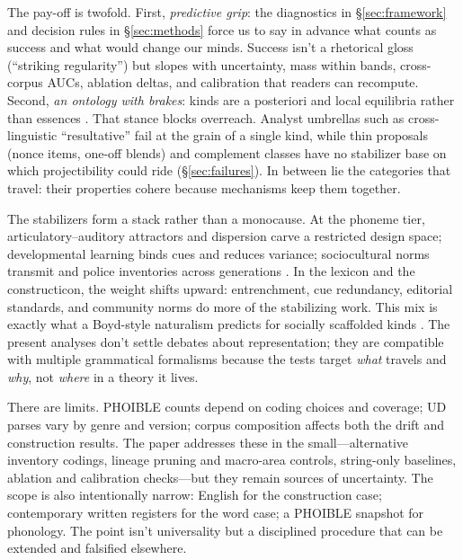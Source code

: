 \documentclass[12pt]{article}
\begin{document}
The pay-off is twofold. First, \emph{predictive grip}: the diagnostics in \S\ref{sec:framework} and decision rules in \S\ref{sec:methods} force us to say in advance what counts as success and what would change our minds. Success isn't a rhetorical gloss (“striking regularity”) but slopes with uncertainty, mass within bands, cross-corpus AUCs, ablation deltas, and calibration that readers can recompute. Second, \emph{an ontology with brakes}: kinds are a posteriori and local equilibria rather than essences \citep{Boyd1991Enthusiasm,Boyd1999Homeostasis}. That stance blocks overreach. Analyst umbrellas such as cross-linguistic “resultative” fail at the grain of a single kind, while thin proposals (nonce items, one-off blends) and complement classes have no stabilizer base on which projectibility could ride (\S\ref{sec:failures}). In between lie the categories that travel: their properties cohere because mechanisms keep them together.

The stabilizers form a stack rather than a monocause. At the phoneme tier, articulatory–auditory attractors and dispersion carve a restricted design space; developmental learning binds cues and reduces variance; sociocultural norms transmit and police inventories across generations \citep{Stevens1989Quantal,LiljencrantsLindblom1972,Lindblom1990HandH,Ekstrom2025PhonemeTool}. In the lexicon and the constructicon, the weight shifts upward: entrenchment, cue redundancy, editorial standards, and community norms do more of the stabilizing work. This mix is exactly what a Boyd-style naturalism predicts for socially scaffolded kinds \citep{Boyd2000Workmanship,Khalidi2013}. The present analyses don't settle debates about representation; they are compatible with multiple grammatical formalisms because the tests target \emph{what} travels and \emph{why}, not \emph{where} in a theory it lives.

There are limits. PHOIBLE counts depend on coding choices and coverage; UD parses vary by genre and version; corpus composition affects both the drift and construction results. The paper addresses these in the small—alternative inventory codings, lineage pruning and macro-area controls, string-only baselines, ablation and calibration checks—but they remain sources of uncertainty. The scope is also intentionally narrow: English for the construction case; contemporary written registers for the word case; a PHOIBLE snapshot for phonology. The point isn't universality but a disciplined procedure that can be extended and falsified elsewhere.
\end{document}
